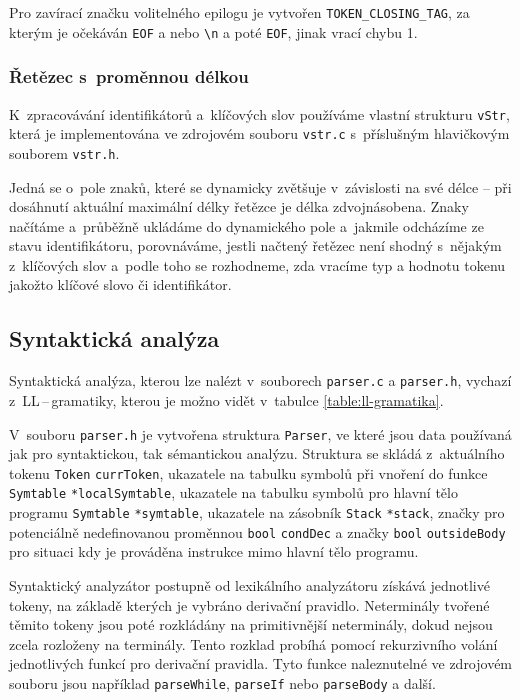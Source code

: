 \documentclass[a4paper,12pt]{article}
\begin{document}
Pro zavírací značku volitelného epilogu je vytvořen \verb|TOKEN_CLOSING_TAG|, za kterým je očekáván \verb|EOF| a nebo \verb|\n| a poté \verb|EOF|, jinak vrací chybu 1.

\subsubsection{Řetězec s~proměnnou délkou}
K~zpracovávání identifikátorů a~klíčových slov používáme vlastní strukturu \verb|vStr|, která je implementována ve zdrojovém souboru \verb|vstr.c| s~příslušným hlavičkovým souborem \verb|vstr.h|.

Jedná se o~pole znaků, které se dynamicky zvětšuje v~závislosti na své délce -- při dosáhnutí aktuální maximální délky řetězce je délka zdvojnásobena. Znaky načítáme a~průběžně ukládáme do dynamického pole
a~jakmile odcházíme ze stavu identifikátoru, porovnáváme, jestli načtený řetězec není shodný s~nějakým z~klíčových slov a~podle
toho se rozhodneme, zda vracíme typ a hodnotu tokenu jakožto klíčové slovo či identifikátor.
\clearpage

\subsection{Syntaktická analýza}
Syntaktická analýza, kterou lze nalézt v~souborech \verb|parser.c| a \verb|parser.h|, vychazí z~LL\,--\,gramatiky, kterou je možno vidět v~tabulce \ref{table:ll-gramatika}.

V~souboru \verb|parser.h| je vytvořena struktura \verb|Parser|, ve které jsou data používaná jak pro syntaktickou, tak sémantickou analýzu. Struktura se skládá z~aktuálního tokenu \verb|Token| \verb|currToken|, ukazatele na tabulku symbolů při vnoření do funkce \verb|Symtable| \verb|*localSymtable|, ukazatele na tabulku symbolů pro hlavní tělo programu \verb|Symtable| \verb|*symtable|, ukazatele na zásobník \verb|Stack| \verb|*stack|, značky pro potenciálně nedefinovanou proměnnou \verb|bool| \verb|condDec| a značky \verb|bool| \verb|outsideBody| pro situaci kdy je prováděna instrukce mimo hlavní tělo programu.

Syntaktický analyzátor postupně od lexikálního analyzátoru získává jednotlivé tokeny, na základě kterých je vybráno derivační pravidlo. Neterminály tvořené těmito tokeny jsou poté rozkládány na primitivnější neterminály, dokud nejsou zcela rozloženy na terminály. Tento rozklad probíhá pomocí rekurzivního volání jednotlivých funkcí pro derivační pravidla. Tyto funkce naleznutelné ve zdrojovém souboru jsou například \verb|parseWhile|, \verb|parseIf| nebo \verb|parseBody| a další.
\end{document}
